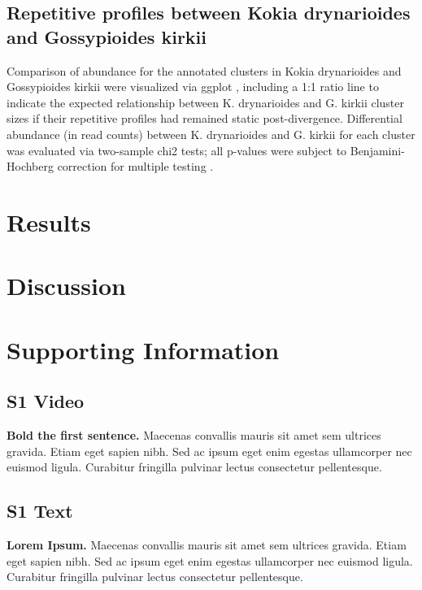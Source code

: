 \documentclass[10pt,letterpaper]{article}
\begin{document}
\subsection*{Repetitive profiles between Kokia drynarioides and Gossypioides kirkii}
Comparison of abundance  for the annotated clusters in Kokia drynarioides and
Gossypioides kirkii were visualized via ggplot \cite{Wickham2016}, including a
1:1 ratio line to indicate the expected relationship between K. drynarioides and
G. kirkii cluster sizes if their repetitive profiles had remained static
post-divergence. Differential abundance (in read counts) between K. drynarioides
and G. kirkii for each cluster was evaluated via two-sample chi2 tests; all
p-values were subject to Benjamini-Hochberg correction for multiple testing
\cite{Benjamini2001}.


\section*{Results}

\section*{Discussion}

\section*{Supporting Information}

\subsection*{S1 Video}
\label{S1_Video}
{\bf Bold the first sentence.}  Maecenas convallis mauris sit amet sem ultrices gravida. Etiam eget sapien nibh. Sed ac ipsum eget enim egestas ullamcorper nec euismod ligula. Curabitur fringilla pulvinar lectus consectetur pellentesque.

\subsection*{S1 Text}
\label{S1_Text}
{\bf Lorem Ipsum.} Maecenas convallis mauris sit amet sem ultrices gravida. Etiam eget sapien nibh. Sed ac ipsum eget enim egestas ullamcorper nec euismod ligula. Curabitur fringilla pulvinar lectus consectetur pellentesque.
\end{document}
